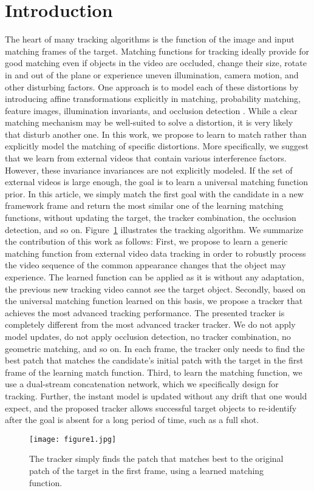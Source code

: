 \documentclass[10pt,twocolumn,letterpaper]{article}
\begin{document}
\section{Introduction}
The heart of many tracking algorithms is the function of the image and input matching frames of the target. Matching functions for tracking ideally provide for good matching even if objects in the video are occluded, change their size, rotate in and out of the plane or experience uneven illumination, camera motion, and other disturbing factors\cite{Smeulders_2014_Visual}. One approach is to model each of these distortions by introducing affine transformations explicitly in matching\cite{Lucas_1981_An}, probability matching\cite{Comaniciu_2000_Real-time}, feature images, illumination invariants\cite{Nguyen_2006_Robust}, and occlusion detection\cite{Pan_2007_Robust} . While a clear matching mechanism may be well-suited to solve a distortion, it is very likely that disturb another one. In this work, we propose to learn to match rather than explicitly model the matching of specific distortions. More specifically, we suggest that we learn from external videos that contain various interference factors. However, these invariance invariances are not explicitly modeled. If the set of external videos is large enough, the goal is to learn a universal matching function prior. In this article, we simply match the first goal with the candidate in a new framework frame and return the most similar one of the learning matching functions, without updating the target, the tracker combination, the occlusion detection, and so on. Figure~\ref{pic1} illustrates the tracking algorithm. We summarize the contribution of this work as follows: First, we propose to learn a generic matching function from external video data tracking in order to robustly process the video sequence of the common appearance changes that the object may experience. The learned function can be applied as it is without any adaptation, the previous new tracking video cannot see the target object. Secondly, based on the universal matching function learned on this basis, we propose a tracker that achieves the most advanced tracking performance. The presented tracker is completely different from the most advanced tracker tracker. We do not apply model updates, do not apply occlusion detection, no tracker combination, no geometric matching, and so on. In each frame, the tracker only needs to find the best patch that matches the candidate's initial patch with the target in the first frame of the learning match function. Third, to learn the matching function, we use a dual-stream concatenation network, which we specifically design for tracking. Further, the instant model is updated without any drift that one would expect, and the proposed tracker allows successful target objects to re-identify after the goal is absent for a long period of time, such as a full shot.
\begin{figure}
	\centering
	\texttt{[image: figure1.jpg]}
	\caption{The tracker simply finds the patch that matches
		best to the original patch of the target in the first frame,
		using a learned matching function. }\label{pic1}
\end{figure}
\end{document}
